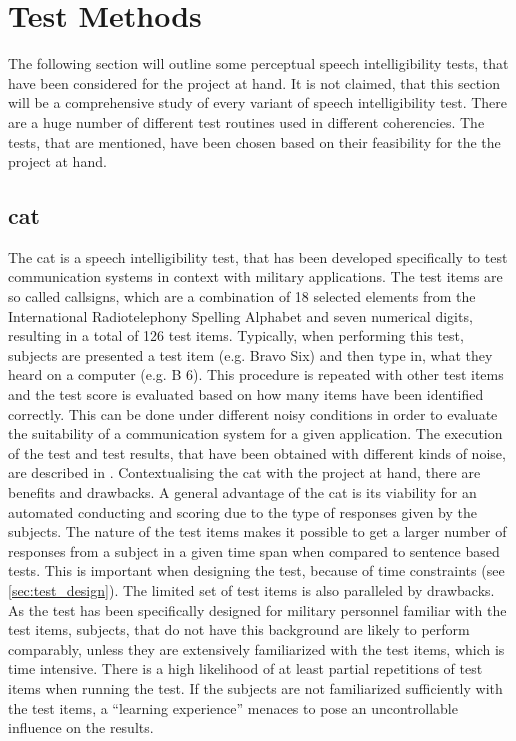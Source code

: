 \section{Test Methods}\label{sec:methods}
The following section will outline some perceptual speech intelligibility tests, that have been considered for the project at hand. It is not claimed, that this section will be a comprehensive study of every variant of speech intelligibility test. There are a huge number of different test routines used in different coherencies. The tests, that are mentioned, have been chosen based on their feasibility for the the project at hand.

\subsection{\gls{cat}}\label{ssec:cat}
The \gls{cat} is a speech intelligibility test, that has been developed specifically to test communication systems in context with military applications. The test items are so called callsigns, which are a combination of 18 selected elements from the International Radiotelephony Spelling Alphabet and seven numerical digits, resulting in a total of 126 test items.
Typically, when performing this test, subjects are presented a test item (e.g. Bravo Six) and then type in, what they heard on a computer (e.g. B 6). This procedure is repeated with other test items and the test score is evaluated based on how many items have been identified correctly.
This can be done under different noisy conditions in order to evaluate the suitability of a communication system for a given application.
The execution of the test and test results, that have been obtained with different kinds of noise, are described in \citep{rao_2006}.
Contextualising the \gls{cat} with the project at hand, there are benefits and drawbacks. A general advantage of the \gls{cat} is its viability for an automated conducting and scoring due to the type of responses given by the subjects. The nature of the test items makes it possible to get a larger number of responses from a subject in a given time span when compared to sentence based tests.
This is important when designing the test, because of time constraints (see \autoref{sec:test_design}).
The limited set of test items is also paralleled by drawbacks. As the test has been specifically designed for military personnel familiar with the test items, subjects, that do not have this background are likely to perform comparably, unless they are extensively familiarized with the test items, which is time intensive. There is a high likelihood of at least partial repetitions of test items when running the test. If the subjects are not familiarized sufficiently with the test items, a \enquote{learning experience} menaces to pose an uncontrollable influence on the results.

